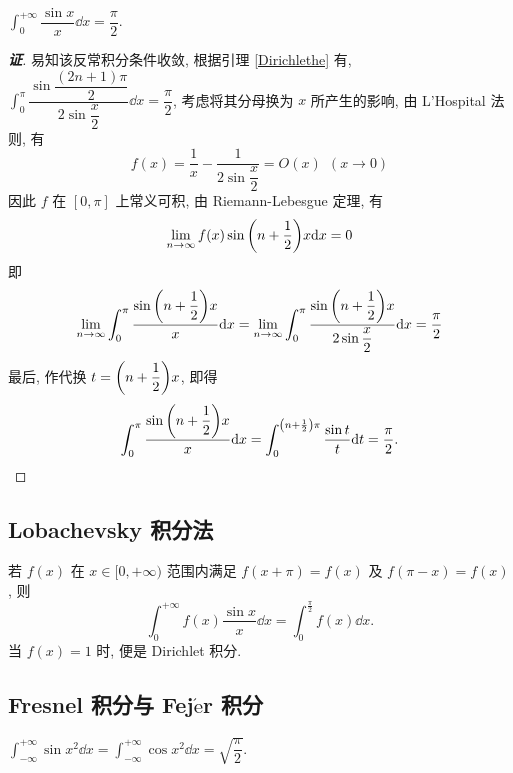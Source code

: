 \begin{theorem}
    $\displaystyle\int_{0}^{+\infty}\dfrac{\sin x}{x}\dd x=\dfrac{\pi}{2}.$
\end{theorem}
\begin{proof}[{\songti \textbf{证}}]
    易知该反常积分条件收敛, 根据引理 \ref{Dirichlethe} 有, $\displaystyle\int_{0}^{\pi}\dfrac{\sin\dfrac{(2n+1)\pi}{2}}{2\sin\dfrac{x}{2}}\dd x=\dfrac{\pi}{2}$, 考虑将其分母换为 $x$ 所产生的影响, 
    由 L'Hospital 法则, 有 $$f(x)=\dfrac{1}{x}-\dfrac{1}{2\sin\dfrac{x}{2}}=O(x)~~ (x\to0)$$
    因此 $f$ 在 $[0,\pi]$ 上常义可积, 由 Riemann-Lebesgue 定理, 有
    $$\lim_{n\to\infty}f(x)\sin\qty(n+\dfrac{1}{2})x\dd x=0$$
    即 $$\lim_{n\to\infty}\int_{0}^{\pi}\dfrac{\sin\qty(n+\dfrac{1}{2})x}{x}\dd x=\lim_{n\to\infty}\int_{0}^{\pi}\dfrac{\sin\qty(n+\dfrac{1}{2})x}{2\sin\dfrac{x}{2}}\dd x=\dfrac{\pi}{2}$$
    最后, 作代换 $t=\qty(n+\dfrac{1}{2})x$, 即得 $$\int_{0}^{\pi}\dfrac{\sin\qty(n+\dfrac{1}{2})x}{x}\dd x=\int_{0}^{\qty(n+\frac{1}{2})\pi}\dfrac{\sin t}{t}\dd t=\dfrac{\pi}{2}.$$
\end{proof}

\subsection{Lobachevsky 积分法}

\begin{theorem}
    若 $f(x)$ 在 $x\in[0,+\infty)$ 范围内满足 $f(x+\pi)=f(x)$ 及 $f(\pi-x)=f(x)$, 则
    $$\int_{0}^{+\infty}f(x)\dfrac{\sin x}{x}\dd x=\int_{0}^{\frac{\pi}{2}}f(x)\dd x.$$
    当 $f(x)=1$ 时, 便是 Dirichlet 积分.
\end{theorem}

\subsection{Fresnel 积分与 Fej\texorpdfstring{$\acute{\text{e}}$}.r 积分}

\begin{theorem}
    $\displaystyle\int_{-\infty}^{+\infty}\sin x^2\dd x=\int_{-\infty}^{+\infty}\cos x^2\dd x=\sqrt{\dfrac{\pi}{2}}.$
\end{theorem}

